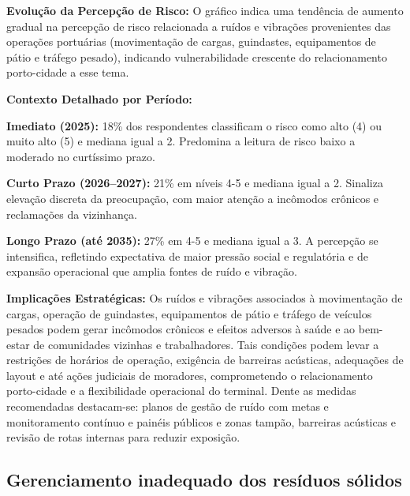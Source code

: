\documentclass[
  portuguese,
  letterpaper,
  DIV=11,
  numbers=noendperiod]{scrreprt}
\begin{document}
\begin{tcolorbox}[enhanced jigsaw, breakable, leftrule=.75mm, opacitybacktitle=0.6, coltitle=black, rightrule=.15mm, colbacktitle=quarto-callout-tip-color!10!white, colframe=quarto-callout-tip-color-frame, titlerule=0mm, bottomtitle=1mm, colback=white, toprule=.15mm, toptitle=1mm, left=2mm, title=\textcolor{quarto-callout-tip-color}{\faLightbulb}\hspace{0.5em}{Destaques}, opacityback=0, bottomrule=.15mm, arc=.35mm]

\textbf{Evolução da Percepção de Risco:} O gráfico indica uma tendência
de aumento gradual na percepção de risco relacionada a ruídos e
vibrações provenientes das operações portuárias (movimentação de cargas,
guindastes, equipamentos de pátio e tráfego pesado), indicando
vulnerabilidade crescente do relacionamento porto-cidade a esse tema.

\textbf{Contexto Detalhado por Período:}

\textbf{Imediato (2025):} 18\% dos respondentes classificam o risco como
alto (4) ou muito alto (5) e mediana igual a 2. Predomina a leitura de
risco baixo a moderado no curtíssimo prazo.

\textbf{Curto Prazo (2026--2027):} 21\% em níveis 4-5 e mediana igual a
2. Sinaliza elevação discreta da preocupação, com maior atenção a
incômodos crônicos e reclamações da vizinhança.

\textbf{Longo Prazo (até 2035):} 27\% em 4-5 e mediana igual a 3. A
percepção se intensifica, refletindo expectativa de maior pressão social
e regulatória e de expansão operacional que amplia fontes de ruído e
vibração.

\textbf{Implicações Estratégicas:} Os ruídos e vibrações associados à
movimentação de cargas, operação de guindastes, equipamentos de pátio e
tráfego de veículos pesados podem gerar incômodos crônicos e efeitos
adversos à saúde e ao bem-estar de comunidades vizinhas e trabalhadores.
Tais condições podem levar a restrições de horários de operação,
exigência de barreiras acústicas, adequações de layout e até ações
judiciais de moradores, comprometendo o relacionamento porto-cidade e a
flexibilidade operacional do terminal. Dente as medidas recomendadas
destacam-se: planos de gestão de ruído com metas e monitoramento
contínuo e painéis públicos e zonas tampão, barreiras acústicas e
revisão de rotas internas para reduzir exposição.

\end{tcolorbox}

\subsection{Gerenciamento inadequado dos resíduos
sólidos}\label{gerenciamento-inadequado-dos-resuxedduos-suxf3lidos}
\end{document}
